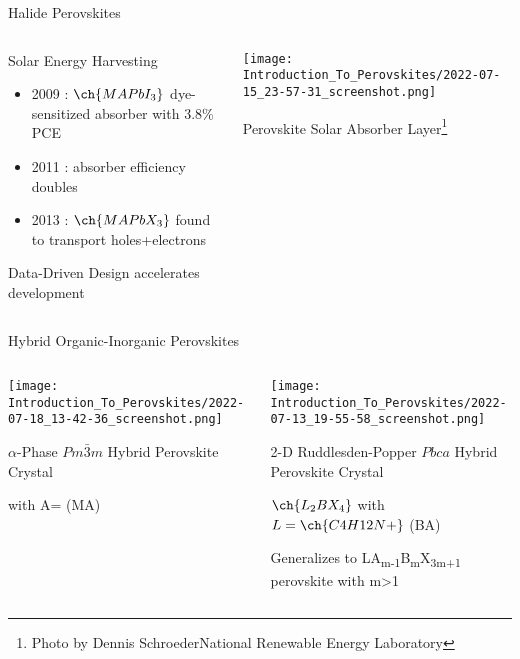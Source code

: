 \documentclass[10pt, compress, aspectratio=169]{beamer}
\begin{document}
\begin{frame}[label={sec:orgc8cabcf}]{Halide Perovskites}
\begin{columns}
\begin{column}{0.4\columnwidth}
\begin{block}{Solar Energy Harvesting}
\begin{itemize}
\item 2009 : \(\ch{MAPbI_3}\) dye-sensitized absorber with 3.8\% PCE\autocite{kojima-2009-organ-halid}
\item 2011 : absorber efficiency doubles\autocite{im-2011}
\item 2013 : \(\ch{MAPbX_3}\) found to transport holes+electrons\autocite{saliba-2014-influen-therm}
\end{itemize}

\alert{Data-Driven Design} accelerates development
\end{block}
\end{column}
\begin{column}{0.6\columnwidth}
\begin{center}
\texttt{[image: Introduction\_To\_Perovskites/2022-07-15\_23-57-31\_screenshot.png]}
\end{center}
Perovskite Solar Absorber Layer\footnote{\tiny{}Photo by Dennis Schroeder\newline{}National Renewable Energy Laboratory}
\end{column}
\end{columns}
\end{frame}
\begin{frame}[allowframebreaks]{Hybrid Organic-Inorganic Perovskites}
\begin{columns}
\begin{column}{0.5\columnwidth}
\begin{center}
\texttt{[image: Introduction\_To\_Perovskites/2022-07-18\_13-42-36\_screenshot.png]}
\end{center}

\(\alpha\)-Phase \(Pm\bar{3}m\) Hybrid Perovskite Crystal\autocite{yan-2016-defec-physic}

 with A= (MA)
\end{column}
\begin{column}{0.5\columnwidth}
\begin{center}
\texttt{[image: Introduction\_To\_Perovskites/2022-07-13\_19-55-58\_screenshot.png]}
\end{center}
2-D Ruddlesden-Popper \(Pbca\) Hybrid Perovskite Crystal\autocite{hong-2021-layer-edge}

\(\ch{L_2BX_4}\) with \(L=\ch{C4H12N+}\) (BA)

Generalizes to LA\textsubscript{m-1}B\textsubscript{m}X\textsubscript{3m+1} perovskite with m>1
\end{column}
\end{columns}
\end{frame}
\end{document}
